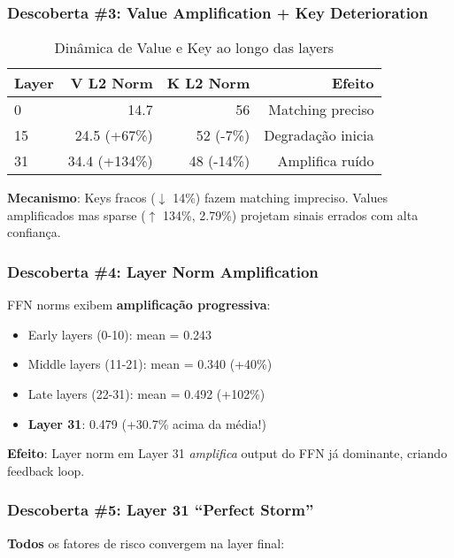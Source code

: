 \documentclass[11pt]{article}
\begin{document}
\subsubsection{Descoberta \#3: Value Amplification + Key Deterioration}

\begin{table}[H]
\centering
\begin{tabular}{@{}lrrr@{}}
\toprule
\textbf{Layer} & \textbf{V L2 Norm} & \textbf{K L2 Norm} & \textbf{Efeito} \\ \midrule
0 & 14.7 & 56 & Matching preciso \\
15 & 24.5 (+67\%) & 52 (-7\%) & Degradação inicia \\
31 & 34.4 (+134\%) & 48 (-14\%) & Amplifica ruído \\ \bottomrule
\end{tabular}
\caption{Dinâmica de Value e Key ao longo das layers}
\end{table}

\textbf{Mecanismo}: Keys fracos ($\downarrow$ 14\%) fazem matching impreciso. Values amplificados mas sparse ($\uparrow$ 134\%, 2.79\%) projetam sinais errados com alta confiança.

\subsubsection{Descoberta \#4: Layer Norm Amplification}

FFN norms exibem \textbf{amplificação progressiva}:
\begin{itemize}
    \item Early layers (0-10): mean = 0.243
    \item Middle layers (11-21): mean = 0.340 (+40\%)
    \item Late layers (22-31): mean = 0.492 (+102\%)
    \item \textbf{Layer 31}: 0.479 (+30.7\% acima da média!)
\end{itemize}

\textbf{Efeito}: Layer norm em Layer 31 \textit{amplifica} output do FFN já dominante, criando feedback loop.

\subsubsection{Descoberta \#5: Layer 31 ``Perfect Storm''}

\textbf{Todos} os fatores de risco convergem na layer final:
\end{document}
